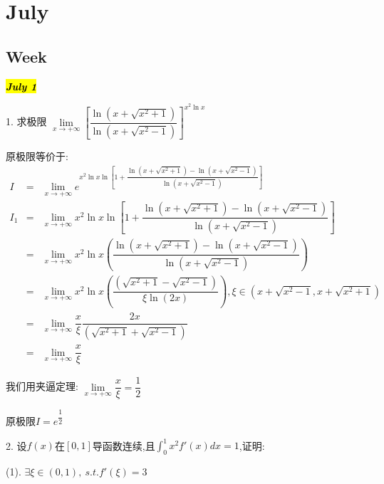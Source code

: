 \chapter{July}
\section{Week }

\hl{\textbf{\textit{July 1}}}

1. 求极限 $\lim\limits_{x\rightarrow +\infty}\left[ \dfrac{\ln(x+\sqrt{x^2+1})}{\ln(x+\sqrt{x^2-1})}\right]^{x^2\ln x} $
\begin{solution}
	
	原极限等价于: 
	\begin{eqnarray*}
		I&=&\lim\limits_{x\rightarrow+\infty}e^{x^2\ln x\ln\left[1+\dfrac{\ln(x+\sqrt{x^2+1})-\ln(x+\sqrt{x^2-1})}{\ln(x+\sqrt{x^2-1})} \right] }\\
		I_{1}&=&\lim\limits_{x\rightarrow+\infty}x^2\ln x\ln\left[1+\dfrac{\ln(x+\sqrt{x^2+1})-\ln(x+\sqrt{x^2-1})}{\ln(x+\sqrt{x^2-1})} \right] \\
		&=&\lim\limits_{x\rightarrow+\infty}x^2\ln x(\dfrac{\ln(x+\sqrt{x^2+1})-\ln(x+\sqrt{x^2-1})}{\ln(x+\sqrt{x^2-1})})\\
		&=&\lim\limits_{x\rightarrow+\infty}x^2\ln x(\dfrac{(\sqrt{x^2+1}-\sqrt{x^2-1})}{\xi \ln(2x)}), \xi\in(x+\sqrt{x^2-1},x+\sqrt{x^2+1})\\
		&=&\lim\limits_{x\rightarrow+\infty}\dfrac{x}{\xi}\dfrac{2x}{(\sqrt{x^2+1}+\sqrt{x^2-1})}\\
		&=&\lim\limits_{x\rightarrow+\infty}\dfrac{x}{\xi}
	\end{eqnarray*}
	
	我们用夹逼定理: $\lim\limits_{x\rightarrow+\infty}\dfrac{x}{\xi}=\dfrac{1}{2}$
	
	原极限$I=e^{\dfrac{1}{2}}$
\end{solution}

2. 设$f(x)$在$[0,1]$导函数连续,且$\int_{0}^{1}x^2f'(x)dx=1$,证明: 

(1). $\exists \xi\in(0,1),\ s.t. f'(\xi)=3$

